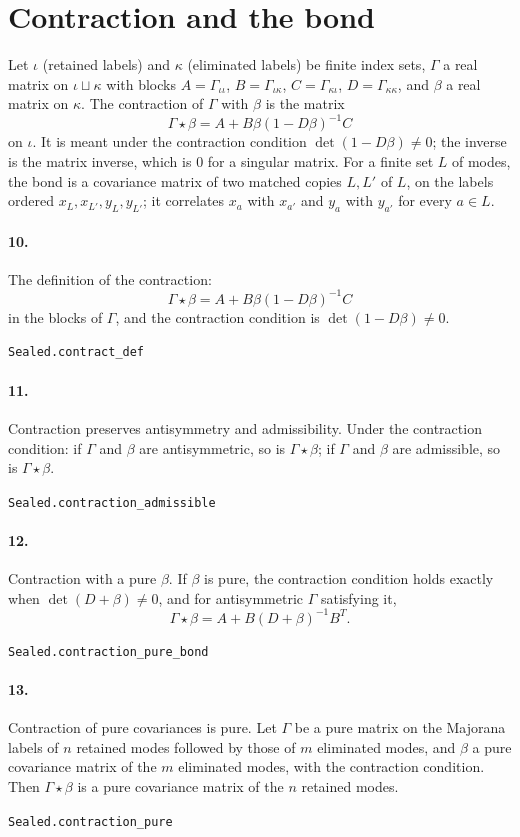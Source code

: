 \documentclass[11pt]{article}
\begin{document}
\section*{Contraction and the bond}
Let $\iota$ (retained labels) and $\kappa$ (eliminated labels) be finite index sets, $\Gamma$ a real matrix on $\iota \sqcup \kappa$ with blocks $A = \Gamma_{\iota\iota}$, $B = \Gamma_{\iota\kappa}$, $C = \Gamma_{\kappa\iota}$, $D = \Gamma_{\kappa\kappa}$, and $\beta$ a real matrix on $\kappa$. The contraction of $\Gamma$ with $\beta$ is the matrix \[\Gamma \star \beta = A + B \beta (1 - D \beta)^{-1} C\] on $\iota$. It is meant under the contraction condition $\det(1 - D \beta) \ne 0$; the inverse is the matrix inverse, which is $0$ for a singular matrix. For a finite set $L$ of modes, the bond is a covariance matrix of two matched copies $L, L'$ of $L$, on the labels ordered $x_L, x_{L'}, y_L, y_{L'}$; it correlates $x_a$ with $x_{a'}$ and $y_a$ with $y_{a'}$ for every $a \in L$.

\paragraph{10.} The definition of the contraction: \[\Gamma \star \beta = A + B \beta (1 - D \beta)^{-1} C\] in the blocks of $\Gamma$, and the contraction condition is $\det(1 - D \beta) \ne 0$.\par{\footnotesize\texttt{Sealed.contract\_def}}

\paragraph{11.} Contraction preserves antisymmetry and admissibility. Under the contraction condition: if $\Gamma$ and $\beta$ are antisymmetric, so is $\Gamma \star \beta$; if $\Gamma$ and $\beta$ are admissible, so is $\Gamma \star \beta$.\par{\footnotesize\texttt{Sealed.contraction\_admissible}}

\paragraph{12.} Contraction with a pure $\beta$. If $\beta$ is pure, the contraction condition holds exactly when $\det(D + \beta) \ne 0$, and for antisymmetric $\Gamma$ satisfying it, \[\Gamma \star \beta = A + B (D + \beta)^{-1} B^T.\]\par{\footnotesize\texttt{Sealed.contraction\_pure\_bond}}

\paragraph{13.} Contraction of pure covariances is pure. Let $\Gamma$ be a pure matrix on the Majorana labels of $n$ retained modes followed by those of $m$ eliminated modes, and $\beta$ a pure covariance matrix of the $m$ eliminated modes, with the contraction condition. Then $\Gamma \star \beta$ is a pure covariance matrix of the $n$ retained modes.\par{\footnotesize\texttt{Sealed.contraction\_pure}}
\end{document}
